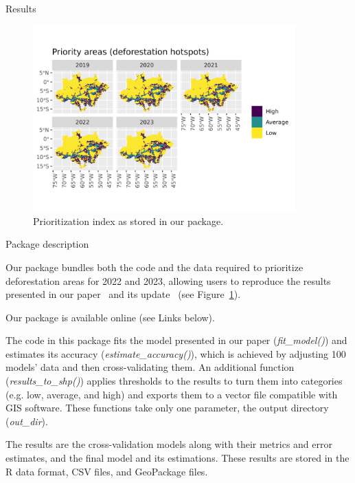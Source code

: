 \documentclass[20pt]{beamer}
\begin{document}
\begin{frame}[fragile,t]
\begin{columns}[t]
\begin{column}{0.33\linewidth}
\begin{block}{Results\vphantom{g}}
\begin{figure}[ht]
\centering
\includegraphics[width=0.9\textwidth,trim={0 1cm 0 2cm},clip] 
{figures/plot_results_precomputed.png}
\caption{Prioritization index as stored in our package.}
\label{fig:plot_results_precomputed}
\end{figure}

    \end{block}
    
\vspace{1cm}
    \begin{block}{Package description}
\label{sec:package}

Our package bundles both the code and the data required to prioritize deforestation areas for 2022 and 2023, allowing users to reproduce the results presented in our paper~\cite{mataveli2022} and its update~\cite{mataveli2023} (see Figure~\ref{fig:plot_results_precomputed}). 

Our package is available online (see Links below).

The code in this package fits the model presented in our paper (\textit{fit\_model()}) and estimates its accuracy (\textit{estimate\_accuracy()}), which is achieved by adjusting 100 models' data and then cross-validating them.
An additional function (\textit{results\_to\_shp()}) applies thresholds to the results to turn them into categories (e.g. low, average, and high) and exports them to a vector file compatible with GIS software.
These functions take only one parameter, the output directory (\textit{out\_dir}).

The results are the cross-validation models along with their metrics and error estimates, and 
the final model and its estimations. 
These results are stored in the R data format, CSV files, and GeoPackage files.


\end{block}
\end{column}
\end{columns}
\end{frame}
\end{document}
